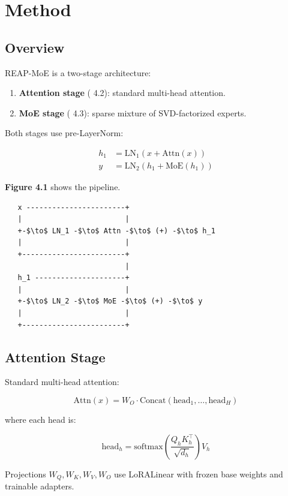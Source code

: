 \section{Method}

\subsection{Overview}

REAP-MoE is a two-stage architecture:

\begin{enumerate}
\item \textbf{Attention stage} ( 4.2): standard multi-head attention.
\item \textbf{MoE stage} ( 4.3): sparse mixture of SVD-factorized experts.

\end{enumerate}
Both stages use pre-LayerNorm:

\[
\begin{aligned}
h_1 &= \text{LN}_1(x + \text{Attn}(x)) \\
y &= \text{LN}_2(h_1 + \text{MoE}(h_1))
\end{aligned}
\tag{4.1}
\]

\textbf{Figure 4.1} shows the pipeline.

\begin{lstlisting}
   x -----------------------+
   |                        |
   +-$\to$ LN_1 -$\to$ Attn -$\to$ (+) -$\to$ h_1
   |                        |
   +------------------------+
                            |
   h_1 ---------------------+
   |                        |
   +-$\to$ LN_2 -$\to$ MoE -$\to$ (+) -$\to$ y
   |                        |
   +------------------------+
\end{lstlisting}

\subsection{Attention Stage}

Standard multi-head attention:

\[
\text{Attn}(x) = W_O \cdot \text{Concat}(\text{head}_1, \dots, \text{head}_H)
\tag{4.2}
\]

where each head is:

\[
\text{head}_h = \text{softmax}\!\left(\frac{Q_h K_h^\top}{\sqrt{d_h}}\right) V_h
\tag{4.3}
\]

Projections $W_Q, W_K, W_V, W_O$ use LoRALinear with frozen base weights 
and trainable adapters.

